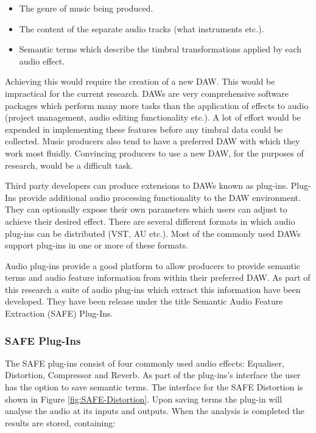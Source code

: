 			\begin{itemize}
				\item The genre of music being produced.
				\item The content of the separate audio tracks (what instruments etc.).
				\item Semantic terms which describe the timbral transformations applied by each audio
					effect.
			\end{itemize}

			Achieving this would require the creation of a new DAW. This would be impractical for the current
			research. DAWs are very comprehensive software packages which perform many more tasks than the
			application of effects to audio (project management, audio editing functionality etc.). A lot of
			effort would be expended in implementing these features before any timbral data could be collected.
			Music producers also tend to have a preferred DAW with which they work most fluidly. Convincing
			producers to use a new DAW, for the purposes of research, would be a difficult task.

			Third party developers can produce extensions to DAWs known as plug-ins. Plug-Ins provide additional
			audio processing functionality to the DAW environment. They can optionally expose their own
			parameters which users can adjust to achieve their desired effect. There are several different
			formats in which audio plug-ins can be distributed (VST, AU etc.). Most of the commonly used DAWs
			support plug-ins in one or more of these formats.

			Audio plug-ins provide a good platform to allow producers to provide semantic terms and audio
			feature information from within their preferred DAW. As part of this research a suite of audio
			plug-ins which extract this information have been developed. They have been release under the title
			Semantic Audio Feature Extraction (SAFE) Plug-Ins.

		\subsubsection{SAFE Plug-Ins}
			The SAFE plug-ins consist of four commonly used audio effects: Equaliser, Distortion, Compressor and
			Reverb. As part of the plug-ins's interface the user has the option to save semantic terms. The
			interface for the SAFE Distortion is shown in Figure \ref{fig:SAFE-Distortion}. Upon saving terms
			the plug-in will analyse the audio at its inputs and outputs. When the analysis is completed the
			results are stored, containing:

